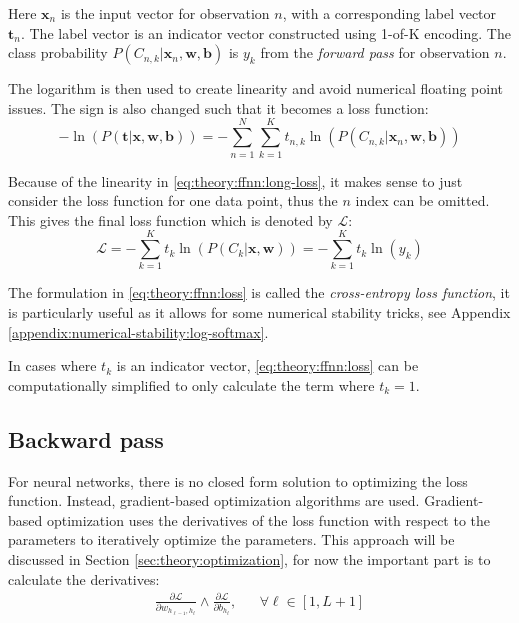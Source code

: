 Here $\mathbf{x}_{n}$ is the input vector for observation $n$, with a corresponding label vector $\mathbf{t}_n$. The label vector is an indicator vector constructed using 1-of-K encoding. The class probability $P(C_{n, k} | \mathbf{x}_n, \mathbf{w}, \mathbf{b})$ is $y_k$ from the \textit{forward pass} for observation $n$.

The logarithm is then used to create linearity and avoid numerical floating point issues. The sign is also changed such that it becomes a loss function:
\begin{equation}
- \ln\left(P(\mathbf{t} | \mathbf{x}, \mathbf{w}, \mathbf{b})\right) = - \sum_{n=1}^N \sum_{k=1}^K t_{n, k} \ln\left( P(C_{n, k} | \mathbf{x}_n, \mathbf{w}, \mathbf{b})\right)
\label{eq:theory:ffnn:long-loss}
\end{equation}

Because of the linearity in \eqref{eq:theory:ffnn:long-loss}, it makes sense to just consider the loss function for one data point, thus the $n$ index can be omitted. This gives the final loss function which is denoted by $\mathcal{L}$:
\begin{equation}
\mathcal{L} = - \sum_{k=1}^K t_{k} \ln\left( P(C_{k} | \mathbf{x}, \mathbf{w})\right) =  - \sum_{k=1}^K t_k \ln(y_k)
\label{eq:theory:ffnn:loss}
\end{equation}

The formulation in \eqref{eq:theory:ffnn:loss} is called the \textit{cross-entropy loss function}, it is particularly useful as it allows for some numerical stability tricks, see Appendix \ref{appendix:numerical-stability:log-softmax}.

In cases where $t_k$ is an indicator vector, \eqref{eq:theory:ffnn:loss} can be computationally simplified to only calculate the term where $t_k = 1$. 

\subsection{Backward pass}

For neural networks, there is no closed form solution to optimizing the loss function. Instead, gradient-based optimization algorithms are used. Gradient-based optimization uses the derivatives of the loss function with respect to the parameters to iteratively optimize the parameters. This approach will be discussed in Section \ref{sec:theory:optimization}, for now the important part is to calculate the derivatives:
\begin{equation}
\begin{aligned}
\frac{\partial \mathcal{L}}{\partial w_{h_{\ell-1}, h_\ell}} \wedge \frac{\partial \mathcal{L}}{\partial b_{h_\ell}}, && \forall \ell \in [1, L + 1]
\end{aligned}
\label{eq:theory:ffnn:bprop-problem}
\end{equation}

